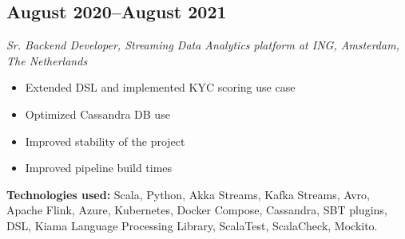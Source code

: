 \subsection*{August 2020--August 2021}

\textit{Sr. Backend Developer, Streaming Data Analytics platform at ING, Amsterdam, The Netherlands}

\begin{itemize}[noitemsep]
  \item Extended DSL and implemented KYC scoring use case
  \item Optimized Cassandra DB use
  \item Improved stability of the project
  \item Improved pipeline build times
\end{itemize}

\textbf{Technologies used:}
Scala, Python, Akka Streams, Kafka Streams, Avro, Apache Flink, Azure, Kubernetes, Docker Compose, Cassandra,
SBT plugins, DSL, Kiama Language Processing Library, ScalaTest, ScalaCheck, Mockito.
